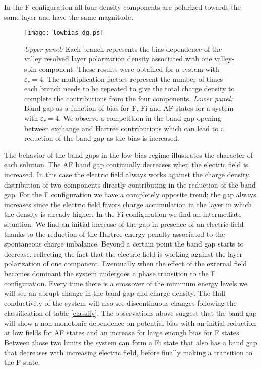 \documentclass[twocolumn,prb,showpacs,preprintnumbers,amsmath,amssymb]{revtex4}
\begin{document}
In the F configuration all four density components are polarized towards the same layer and have the same magnitude.
\begin{figure}[htbp]
\begin{center}
\texttt{[image: lowbias\_dg.ps]} 
\caption{
{\em Upper panel:}
Each branch represents the bias dependence of the valley resolved layer polarization density 
associated with one valley-spin component.  These results were obtained for a system with $\varepsilon_r = 4$. 
The multiplication factors represent the number of times each branch needs to be repeated
to give the total charge density to complete the contributions from the four components.
{\em Lower panel:}
Band gap as a function of bias for F, Fi and AF states for a system with $\varepsilon_r = 4$.
We observe a competition in the band-gap opening between exchange and 
Hartree contributions which can lead to a
reduction of the band gap as the bias is increased.
}
\label{lowgap}
\end{center}
\end{figure}

The behavior of the band gaps in the low bias regime illustrates the character of each solution.
The AF band gap continually decreases when the electric field is increased. 
In this case the electric field always works against the charge density distribution 
of two components directly contributing in the reduction of the band gap.
For the F configuration we have a completely opposite trend; the gap always increases
since the electric field favors charge
accumulation in the layer in which the density is already higher. 
In the Fi configuration we find an intermediate situation.
We find an initial increase of the gap in presence of an electric field thanks to the 
reduction of the Hartree energy penalty associated to the spontaneous charge imbalance. 
Beyond a certain point the band gap starts to decrease, reflecting the fact that 
the electric field is working against the layer polarization of one component. 
Eventually when the effect of the external field becomes dominant  the system undergoes a phase
transition to the F configuration. 
Every time there is a crossover of the minimum energy levels
we will see an abrupt change in the band gap and charge density.
The Hall conductivity of the system will also see discontinuous changes 
following the classification of table \ref{classify}.
The observations above suggest that the band gap will show a non-monotonic dependence on potential bias 
with an initial reduction at low fields for AF states and an increase for large enough bias for F states.
Between those two limits the system can form a Fi state that also 
has a band gap that decreases with increasing electric field,
before finally making a transition to the F state.
\end{document}
